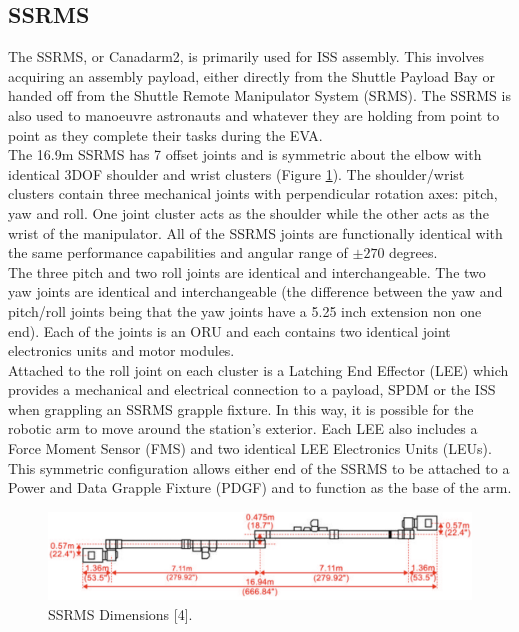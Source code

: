 \documentclass[a4paper,12pt,oneside]{report}
\begin{document}
\subsection{SSRMS}
The SSRMS, or Canadarm2, is primarily used for ISS assembly. This involves acquiring an assembly payload, either directly from the Shuttle Payload Bay or handed off from the Shuttle Remote Manipulator System (SRMS). The SSRMS is also used to manoeuvre astronauts and whatever they are holding from point to point as they complete their tasks during the EVA.\\
The 16.9m SSRMS has 7 offset joints and is symmetric about the elbow with identical 3DOF shoulder and wrist clusters (Figure \ref{SSRMS_dim}). The shoulder/wrist clusters contain three mechanical joints with perpendicular rotation axes: pitch, yaw and roll. One joint cluster acts as the shoulder while the other acts as the wrist of the manipulator. All of the SSRMS joints are functionally identical with the same performance capabilities and angular range of $\pm 270$ degrees. \\
The three pitch and two roll joints are identical and interchangeable. The two yaw joints are identical and interchangeable (the difference between the yaw and pitch/roll joints being that the yaw joints have a 5.25 inch extension non one end). Each of the joints is an ORU and each contains two identical joint electronics units and motor modules.\\
Attached to the roll joint on each cluster is a Latching End Effector (LEE) which provides a mechanical and electrical connection to a payload, SPDM or the ISS when grappling an SSRMS grapple fixture. In this way, it is possible for the robotic arm to move around the station's exterior. Each LEE also includes a Force Moment Sensor (FMS) and two identical LEE Electronics Units (LEUs). This symmetric configuration allows either end of the SSRMS to be attached to a Power and Data Grapple Fixture (PDGF) and to function as the base of the arm.\\
\begin{figure}[t]
  \centering
  \includegraphics[scale=0.3]{SSRMS_dimensions.png}
  \caption{SSRMS Dimensions [4].}
  \label{SSRMS_dim}
\end{figure}
\end{document}
